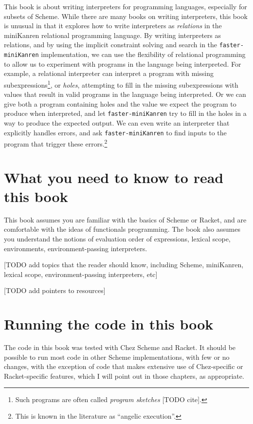 \documentclass{book}
\begin{document}
This book is about writing interpreters for programming languages, especially for subsets of Scheme.
While there are many books on writing interpreters, this book is unusual in that it explores
how to write interpreters as \emph{relations} in the miniKanren relational programming language.
By writing interpreters as relations, and by using the implicit constraint solving and search in the \texttt{faster-miniKanren} implementation, we can use the flexibility of relational programming to allow us to experiment with programs in the language being interpreted.  For example, a relational interpreter can interpret a program with missing subexpressions\footnote{Such programs are often called \emph{program sketches} [TODO cite].}, or \emph{holes}, attempting to fill in the missing subexpressions with values that result in valid programs in the language being interpreted.  Or we can give both a program containing holes and the value we expect the program to produce when interpreted, and let \texttt{faster-miniKanren} try to fill in the holes in a way to produce the expected output.  We can even write an interpreter that explicitly handles errors, and ask \texttt{faster-miniKanren} to find inputs to the program that trigger these errors.\footnote{This is known in the literature as ``angelic execution''.}

\section{What you need to know to read this book}

This book assumes you are familiar with the basics of Scheme or Racket, and are comfortable with the ideas of functionals programming.  The book also assumes you understand the notions of evaluation order of expressions, lexical scope, environments, environment-passing interpreters.

[TODO add topics that the reader should know, including Scheme, miniKanren, lexical scope, environment-passing interpreters, etc]

[TODO add pointers to resources]

\section{Running the code in this book}

The code in this book was tested with Chez Scheme and Racket.  It should be possible to run most code in other Scheme implementations, with few or no changes, with the exception of code that makes extensive use of Chez-specific or Racket-specific features, which I will point out in those chapters, as appropriate.
\end{document}
